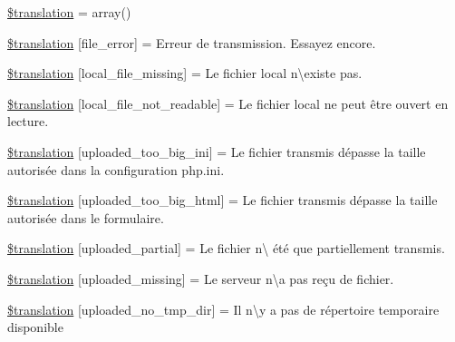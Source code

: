 \begin{DoxyCompactItemize}
\item 
\hyperlink{class_8upload_8fr___f_r_8php_a1f198d410fecc3871ebdd468d343a5e3}{\$translation} = array()
\item 
\hyperlink{class_8upload_8fr___f_r_8php_ac7498e49b9771b04698029aa61c70821}{\$translation} \mbox{[}\textquotesingle{}file\+\_\+error\textquotesingle{}\mbox{]} = \textquotesingle{}Erreur de transmission. Essayez encore.\textquotesingle{}
\item 
\hyperlink{class_8upload_8fr___f_r_8php_a6ec3d3a47ab70d77e7aa593e82ead10e}{\$translation} \mbox{[}\textquotesingle{}local\+\_\+file\+\_\+missing\textquotesingle{}\mbox{]} = \textquotesingle{}Le fichier local n\textbackslash{}\textquotesingle{}existe pas.\textquotesingle{}
\item 
\hyperlink{class_8upload_8fr___f_r_8php_a60104befef9b241f3a7a6a755618a4b3}{\$translation} \mbox{[}\textquotesingle{}local\+\_\+file\+\_\+not\+\_\+readable\textquotesingle{}\mbox{]} = \textquotesingle{}Le fichier local ne peut être ouvert en lecture.\textquotesingle{}
\item 
\hyperlink{class_8upload_8fr___f_r_8php_a6a08dcd0d3651fdd098568f6b2f0a42c}{\$translation} \mbox{[}\textquotesingle{}uploaded\+\_\+too\+\_\+big\+\_\+ini\textquotesingle{}\mbox{]} = \textquotesingle{}Le fichier transmis dépasse la taille autorisée dans la configuration php.\+ini.\textquotesingle{}
\item 
\hyperlink{class_8upload_8fr___f_r_8php_a623d5b8b92169f57d7e43458aa911cbb}{\$translation} \mbox{[}\textquotesingle{}uploaded\+\_\+too\+\_\+big\+\_\+html\textquotesingle{}\mbox{]} = \textquotesingle{}Le fichier transmis dépasse la taille autorisée dans le formulaire.\textquotesingle{}
\item 
\hyperlink{class_8upload_8fr___f_r_8php_a967c17da21b0a2d3bd65cca3a9ca0ea8}{\$translation} \mbox{[}\textquotesingle{}uploaded\+\_\+partial\textquotesingle{}\mbox{]} = \textquotesingle{}Le fichier n\textbackslash{}\textquotesingle{} été que partiellement transmis.\textquotesingle{}
\item 
\hyperlink{class_8upload_8fr___f_r_8php_a0cce433260be65f1f35853a6b4b8952b}{\$translation} \mbox{[}\textquotesingle{}uploaded\+\_\+missing\textquotesingle{}\mbox{]} = \textquotesingle{}Le serveur n\textbackslash{}\textquotesingle{}a pas reçu de fichier.\textquotesingle{}
\item 
\hyperlink{class_8upload_8fr___f_r_8php_ae3cdc68fe248399f77246c91b0555341}{\$translation} \mbox{[}\textquotesingle{}uploaded\+\_\+no\+\_\+tmp\+\_\+dir\textquotesingle{}\mbox{]} = \textquotesingle{}Il n\textbackslash{}\textquotesingle{}y a pas de répertoire temporaire disponible\textquotesingle{}

\end{DoxyCompactItemize}
